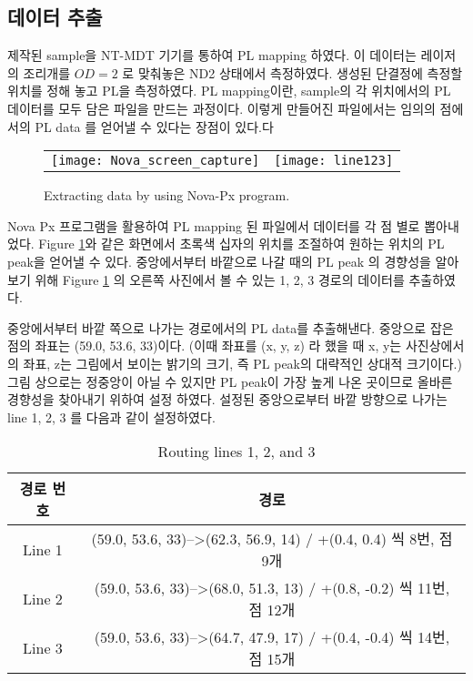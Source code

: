 \subsection{데이터 추출}
제작된 sample을 NT-MDT 기기를 통하여 PL mapping 하였다. 이 데이터는 레이저의 조리개를 $OD = 2$ 로 맞춰놓은 ND2 상태에서 측정하였다. 생성된 단결정에 측정할 위치를 정해 놓고 PL을 측정하였다.  PL mapping이란, sample의 각 위치에서의 PL 데이터를 모두 담은 파일을 만드는 과정이다. 이렇게 만들어진 파일에서는 임의의 점에서의 PL data 를 얻어낼 수 있다는 장점이 있다.다
\begin{figure}[H]
	\begin{center}
		\begin{tabular}{cc}
			\texttt{[image: Nova\_screen\_capture]}&
			\texttt{[image: line123]}
		\end{tabular}
	\end{center}
	\caption{Extracting data by using Nova-Px program.}
	\label{fig:nova}  
\end{figure}
Nova Px 프로그램을 활용하여 PL mapping 된 파일에서 데이터를 각 점 별로 뽑아내었다. Figure \ref{fig:nova}와 같은 화면에서 초록색 십자의 위치를 조절하여 원하는 위치의 PL peak을 얻어낼 수 있다. 중앙에서부터 바깥으로 나갈 때의 PL peak 의 경향성을 알아보기 위해 Figure \ref{fig:nova} 의 오른쪽 사진에서 볼 수 있는 1, 2, 3 경로의 데이터를 추출하였다.

중앙에서부터 바깥 쪽으로 나가는 경로에서의 PL data를 추출해낸다. 중앙으로 잡은 점의 좌표는 (59.0, 53.6, 33)이다. (이때 좌표를 (x, y, z) 라 했을 때 x, y는 사진상에서의 좌표, z는 그림에서 보이는 밝기의 크기, 즉 PL peak의 대략적인 상대적 크기이다.) 그림 상으로는 정중앙이 아닐 수 있지만 PL peak이 가장 높게 나온 곳이므로 올바른 경향성을 찾아내기 위하여 설정 하였다. 설정된 중앙으로부터 바깥 방향으로 나가는 line 1, 2, 3 를 다음과 같이 설정하였다.

\begin{table}[H]%
	\caption{Routing lines 1, 2, and 3}
	\label{table01}
	\centering
	\begin{tabular}{c c}
	\toprule
	경로 번호 & 경로\\
	\toprule
	Line 1 & (59.0, 53.6, 33)-->(62.3, 56.9, 14) / +(0.4, 0.4) 씩 8번, 점 9개\\
	Line 2 & (59.0, 53.6, 33)-->(68.0, 51.3, 13) / +(0.8, -0.2) 씩 11번, 점 12개\\
	Line 3 & (59.0, 53.6, 33)-->(64.7, 47.9, 17) / +(0.4, -0.4) 씩 14번, 점 15개\\
	\toprule
	\end{tabular}
	\end{table}

